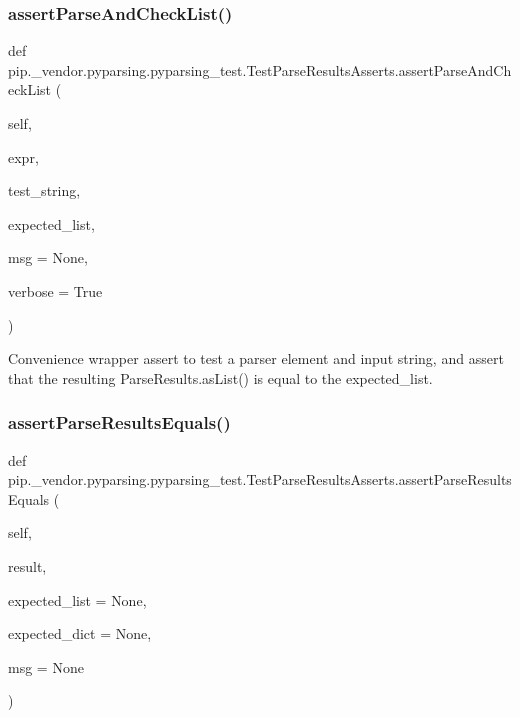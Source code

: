 \subsubsection{\texorpdfstring{assert\+Parse\+And\+Check\+List()}{assertParseAndCheckList()}}
{\footnotesize\ttfamily def pip.\+\_\+vendor.\+pyparsing.\+pyparsing\+\_\+test.\+Test\+Parse\+Results\+Asserts.\+assert\+Parse\+And\+Check\+List (\begin{DoxyParamCaption}\item[{}]{self,  }\item[{}]{expr,  }\item[{}]{test\+\_\+string,  }\item[{}]{expected\+\_\+list,  }\item[{}]{msg = {\ttfamily None},  }\item[{}]{verbose = {\ttfamily True} }\end{DoxyParamCaption})}

\begin{DoxyVerb}Convenience wrapper assert to test a parser element and input string, and assert that
the resulting ParseResults.asList() is equal to the expected_list.
\end{DoxyVerb}
 \mbox{\label{classpip_1_1__vendor_1_1pyparsing_1_1pyparsing__test_1_1TestParseResultsAsserts_aaf51deb00e547fe71636fbc50ca93016}} 
\subsubsection{\texorpdfstring{assert\+Parse\+Results\+Equals()}{assertParseResultsEquals()}}
{\footnotesize\ttfamily def pip.\+\_\+vendor.\+pyparsing.\+pyparsing\+\_\+test.\+Test\+Parse\+Results\+Asserts.\+assert\+Parse\+Results\+Equals (\begin{DoxyParamCaption}\item[{}]{self,  }\item[{}]{result,  }\item[{}]{expected\+\_\+list = {\ttfamily None},  }\item[{}]{expected\+\_\+dict = {\ttfamily None},  }\item[{}]{msg = {\ttfamily None} }\end{DoxyParamCaption})}

